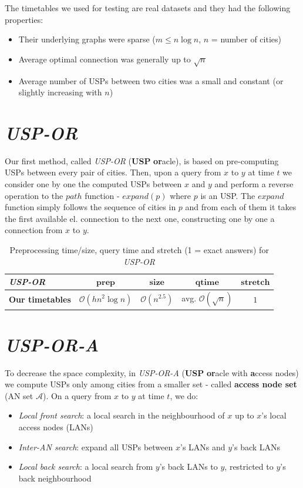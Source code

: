 \documentclass[myposter,portrait]{sciposter}
\def\mysection#1{
{\color{sectionCol}\section*{\sc\bfseries #1}}}
\begin{document}
\begin{multicols*}{3}
	The timetables we used for testing are real datasets and they had the following properties:
	\begin{itemize}
		\item Their underlying graphs were sparse ($m \leq n \log n$, $n$ = number of cities)
		\item Average optimal connection was generally up to $\sqrt{n}$ 
		\item Average number of USPs between two cities was a small and constant (or slightly increasing with $n$)
	\end{itemize}
	\hspace{\fill}

\mysection{\textit{USP-OR}}

	Our first method, called \textit{USP-OR} (\textbf{USP} \textbf{or}acle), is based on pre-computing USPs between every pair of cities. Then, upon a query from $x$ to $y$ at time $t$ we consider one by one the computed USPs between $x$ and $y$ and perform a reverse operation to the $path$ function - $expand(p)$ where $p$ is an USP. The $expand$ function simply follows the sequence of cities in $p$ and from each of them it takes the first available el. connection to the next one, constructing one by one a connection from $x$ to $y$. 
	
	\begin{table}[h!]
		\centering
		\begin{tabular}{l|c|c|c|c}
			\cellcolor{oracle-clr} \textit{\textbf{USP-OR}} & \cellcolor{oracle-clr} $\bm{prep}$ & \cellcolor{oracle-clr} $\bm{size}$ & \cellcolor{oracle-clr} $\bm{qtime}$ & \cellcolor{oracle-clr} $\bm{stretch}$ \\
			\hline
			\cellcolor{oracle-clr} \textbf{Our timetables} & $\mathcal{O}(hn^{2} \log n)$ & $\mathcal{O}(n^{2.5})$ & avg. $\mathcal{O}(\sqrt{n})$ & $1$ \\
		\end{tabular}
		\caption{\label{tab:uspor} Preprocessing time/size, query time and stretch (1 = exact answers) for \textit{USP-OR}}
	\end{table}	

\mysection{\textit{USP-OR-A}}

	To decrease the space complexity, in \textit{USP-OR-A} (\textbf{USP} \textbf{or}acle with \textbf{a}ccess nodes) we compute USPs only among cities from a smaller set - called \textbf{access node set} (AN set $\bm{\mathcal{A}}$). On a query from $x$ to $y$ at time $t$, we do:
	\begin{itemize}
		\item \textit{Local front search}: a local search in the neighbourhood of $x$ up to $x$'s local access nodes (LANs)
		\item \textit{Inter-AN search}: expand all USPs between $x$'s LANs and $y$'s back LANs
		\item \textit{Local back search}: a local search from $y$'s back LANs to $y$, restricted to $y$'s back neighbourhood
	\end{itemize}		


\end{multicols*}
\end{document}
